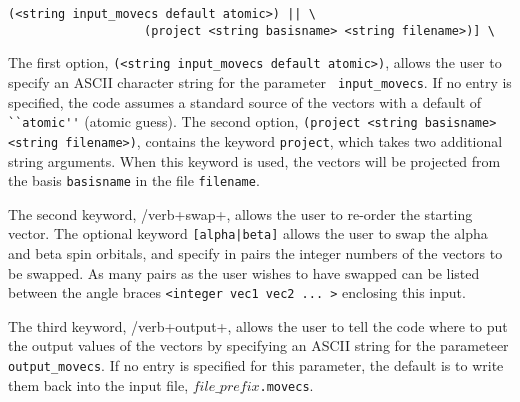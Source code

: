 \begin{verbatim}
(<string input_movecs default atomic>) || \
                   (project <string basisname> <string filename>)] \

\end{verbatim}

The first option, \verb+(<string input_movecs default atomic>)+, allows
the user to specify an ASCII character string for the parameter {\tt 
input\_movecs}.
If no entry is specified, the code assumes a
standard source of the vectors with a default of \verb+``atomic''+ 
(atomic guess).  The second option, 
\verb+(project <string basisname> <string filename>)+, contains the
keyword \verb+project+, which takes two additional string arguments.
When this keyword is used, the vectors will be projected from the basis
\verb+basisname+ in the file \verb+filename+.

The second keyword, /verb+swap+, allows the user to re-order the starting
vector.  The optional keyword \verb+[alpha|beta]+ allows the user to swap
the alpha and beta spin orbitals, and specify in pairs the integer numbers
of the vectors to be swapped.  As many pairs as the user wishes to have
swapped can be listed between the angle braces \verb+<integer vec1 vec2 ... >+
enclosing this input.

The third keyword, /verb+output+, allows the user to tell the code where
to put the output values of the vectors by specifying an ASCII string
for the parameteer {\tt output\_movecs}.  If no entry is specified for
this parameter, the default is to write them
back into the input file, {\tt $file\_prefix$.movecs}.


